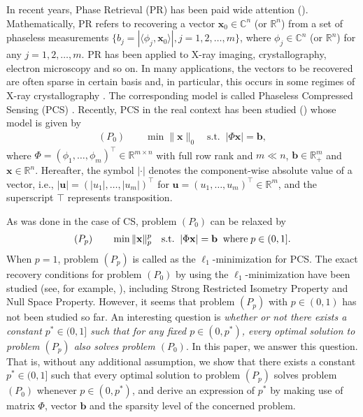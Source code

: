 \documentclass[12pt]{article}
\begin{document}
In recent years, Phase Retrieval (PR) has been paid wide attention (\cite{balan09Phaseless,balan06OnPR,candes13MatrixCompletion,candes13PhaseLift}). Mathematically, PR refers to
recovering a vector $\mathbf{x}_0\in\mathbb{C}^{n}$ (or $\mathbb{R}^{n}$) from a set of
phaseless measurements $\{b_j=|\langle\phi_j, \mathbf{x}_0\rangle |,
j=1,2,\ldots, m\}$, where $\phi_j\in \mathbb{C}^{n}$ (or $\mathbb{R}^{n}$) for any
$j=1,2,\ldots,m$. PR has been applied to X-ray imaging, crystallography, electron microscopy and so on. In many applications, the vectors to be recovered are often sparse in
certain basis and, in particular, this occurs in some regimes of
X-ray crystallography \cite{Xu14SPR}. The corresponding model is called Phaseless
Compressed Sensing (PCS) \cite{PhaselessCS2016}.
Recently, PCS in the real context has been studied (\cite{GWX-16,PhaselessCS2016,Xu14SPR}) whose model is given by
\begin{eqnarray*}%
(P_0)    \quad\quad\min \|\mathbf{x}\|_0\quad \textrm{s.t.}\;\; |\Phi\mathbf{x}|=\mathbf{b},
\end{eqnarray*}
where $ \Phi=(\phi_1,\ldots,\phi_m)^{\top}\in \mathbb{R}^{m\times n}$ with full row rank and $m\ll n$, $\mathbf{b}\in \mathbb{R}^{m}_+$ and $\mathbf{x}\in \mathbb{R}^{n}$. Hereafter, the symbol $|\cdot|$ denotes the component-wise absolute value of a vector, i.e.,  $|\mathbf{u}|=(|u_1|,\ldots,|u_m|)^{\top}$ for $\mathbf{u}=(u_1,\ldots,u_m)^{\top}\in \mathbb{R}^m$, and the superscript $\top$ represents transposition.

As was done in the case of CS, problem $(P_0)$ can be relaxed by
\begin{eqnarray*}%
(P_p)\quad\quad \min \|\mathbf{x}\|_p^p\quad
\textrm{s.t.}\;\;|\Phi\mathbf{x}|=\mathbf{b}\;\; \mbox{\rm where}\; p\in (0,1].
\end{eqnarray*}
When $p=1$, problem $(P_p)$ is called as the $\ell_1$-minimization for PCS. The exact recovery conditions for problem $(P_0)$ by using the $\ell_1$-minimization have been studied (see, for example, \cite{GWX-16,PhaselessCS2016,Xu14SPR}), including Strong Restricted Isometry Property and Null Space Property. However, it seems that problem $(P_p)$ with $p\in (0,1)$ has not been studied so far. An interesting question is {\it whether or not there exists a constant $p^\ast\in (0,1]$ such that for any fixed $p\in (0,p^\ast)$, every optimal solution to problem $(P_p)$ also solves problem $(P_0)$}. In this paper, we answer this question. That is, without any additional assumption, we show that there exists a constant $p^\ast\in (0,1]$ such that every optimal solution to problem $(P_p)$ solves problem $(P_0)$ whenever $p\in (0,p^\ast)$, and derive an expression of $p^\ast$ by making use of matrix $\Phi$, vector $\textbf{b}$ and the sparsity level of the concerned problem.
\end{document}
